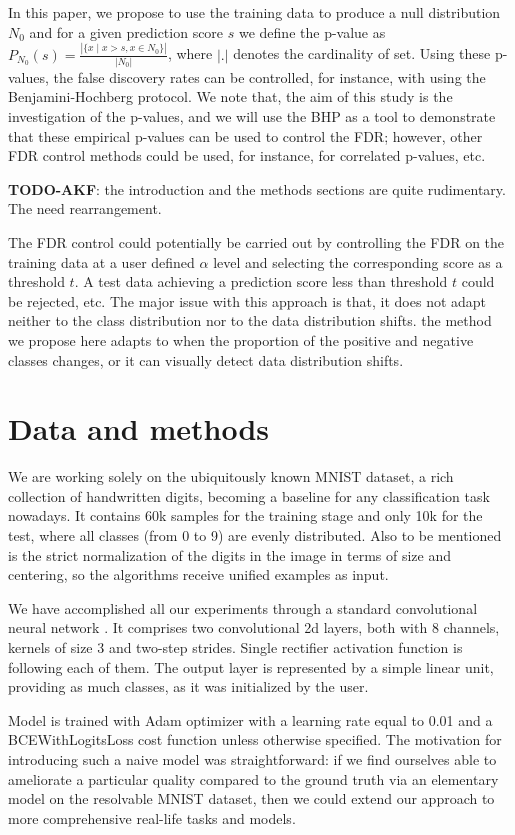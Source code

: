 \documentclass{article}
\newcommand{\todo}[2]{{\color{red} {\bf TODO-#1}: #2}}
\begin{document}
In this paper, we propose to use the training data to produce a null distribution $N_0$ and for a given prediction score $s$ we define the p-value as $P_{N_0}(s)=\frac{|\{x\mid x>s, x \in N_0\}|}{|N_0|}$, where $|.|$ denotes the cardinality of set. Using these p-values, the false discovery rates can be controlled, for instance, with using the Benjamini-Hochberg protocol. We note that, the aim of this study is the investigation of the p-values, and we will use the BHP as a tool to demonstrate that these empirical p-values can be used to control the FDR; however, other FDR control methods could be used, for instance, for correlated p-values, etc. 

\todo{AKF}{the introduction and the methods sections are quite rudimentary. The need rearrangement.}

The FDR control could potentially be carried out by controlling the FDR on the training data at a user defined $\alpha$ level and selecting the corresponding score as a threshold $t$. A test data achieving a prediction score less than threshold $t$ could be rejected, etc. The major issue with this approach is that, it does not adapt neither to the class distribution nor to the data distribution shifts. the method we propose here adapts to when the proportion of the positive and negative classes changes, or it can visually detect data distribution shifts. 


\section{Data and methods}

We are working solely on the ubiquitously known MNIST dataset, a rich collection of handwritten digits, becoming a baseline for any classification task nowadays. It contains 60k samples for the training stage and only 10k for the test, where all classes (from 0 to 9) are evenly distributed. Also to be mentioned is the strict normalization of the digits in the image in terms of size and centering, so the algorithms receive unified examples as input.

We have accomplished all our experiments through a standard convolutional neural network \cite{cnn}. It comprises two convolutional 2d layers, both with 8 channels, kernels of size 3 and two-step strides. Single rectifier activation function is following each of them.  The output layer is represented by a simple linear unit, providing as much classes, as it was initialized by the user.   

Model is trained with Adam optimizer with a learning rate equal to 0.01 and a BCEWithLogitsLoss cost function unless otherwise specified. The motivation for introducing such a naive model was straightforward: if we find ourselves able to ameliorate a particular quality compared to the ground truth via an elementary model on the resolvable MNIST dataset, then we could extend our approach to more comprehensive real-life tasks and models.
\end{document}
